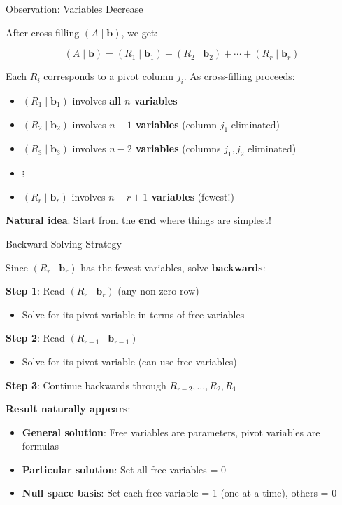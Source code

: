 \documentclass[10pt]{beamer}
\theoremstyle{definition}
\newcommand{\x}[1]{\alert{\textbf{#1}}}
\begin{document}
\begin{frame}{Observation: Variables Decrease}

After cross-filling $(A \mid \mathbf{b})$, we get:

$$(A \mid \mathbf{b}) = (R_1 \mid \mathbf{b}_1) + (R_2 \mid \mathbf{b}_2) + \cdots + (R_r \mid \mathbf{b}_r)$$

\vspace{0.5em}

Each $R_i$ corresponds to a pivot column $j_i$. As cross-filling proceeds:

\begin{itemize}
\item $(R_1 \mid \mathbf{b}_1)$ involves \x{all $n$ variables}
\item $(R_2 \mid \mathbf{b}_2)$ involves \x{$n-1$ variables} (column $j_1$ eliminated)
\item $(R_3 \mid \mathbf{b}_3)$ involves \x{$n-2$ variables} (columns $j_1, j_2$ eliminated)
\item $\vdots$
\item $(R_r \mid \mathbf{b}_r)$ involves \x{$n-r+1$ variables} (fewest!)
\end{itemize}

\vspace{0.5em}

\x{Natural idea}: Start from the \textbf{end} where things are simplest!

\end{frame}

\begin{frame}{Backward Solving Strategy}

Since $(R_r \mid \mathbf{b}_r)$ has the fewest variables, solve \x{backwards}:

\vspace{0.5em}

\textbf{Step 1}: Read $(R_r \mid \mathbf{b}_r)$ (any non-zero row)
\begin{itemize}
\item Solve for its pivot variable in terms of free variables
\end{itemize}

\textbf{Step 2}: Read $(R_{r-1} \mid \mathbf{b}_{r-1})$
\begin{itemize}
\item Solve for its pivot variable (can use free variables)
\end{itemize}

\textbf{Step 3}: Continue backwards through $R_{r-2}, \ldots, R_2, R_1$

\vspace{0.5em}

\x{Result naturally appears}:
\begin{itemize}
\item \textbf{General solution}: Free variables are parameters, pivot variables are formulas
\item \textbf{Particular solution}: Set all free variables = 0
\item \textbf{Null space basis}: Set each free variable = 1 (one at a time), others = 0
\end{itemize}

\end{frame}
\end{document}
